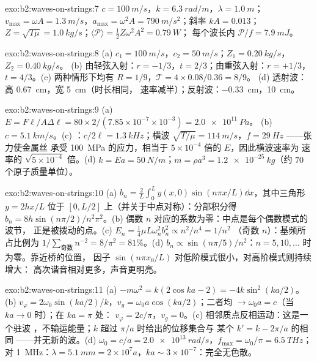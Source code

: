 \begin{solution}{exo:b2:waves-on-strings:7}
$c = \qty{100}{m/s}$，$k = \qty{6.3}{rad/m}$，$\lambda = \qty{1.0}{m}$；$v_{\max} = \omega A =
\qty{1.3}{m/s}$，$a_{\max} = \omega^2A = \qty{790}{m/s^2}$；斜率 $kA = 0.013$；$Z =
\sqrt{T\mu} = \qty{1.0}{kg/s}$；$\langle\mathcal P\rangle = \tfrac12Z\omega^2A^2 = \qty{0.79}{W}$；
每个波长内 $\mathcal P/f = \qty{7.9}{mJ}$。
\end{solution}

\begin{solution}{exo:b2:waves-on-strings:8}
(a) $c_1 = \qty{100}{m/s}$，$c_2 = \qty{50}{m/s}$；$Z_1 = \qty{0.20}{kg/s}$，$Z_2 = \qty{0.40}{kg/s}$。
(b) 由轻弦入射：$r = -1/3$，$t = 2/3$；由重弦入射：$r =
+1/3$，$t = 4/3$。(c) 两种情形下均有 $R = 1/9$，$\mathcal T = 4 \times 0.08/0.36 = 8/9$。
(d) 透射波：高 \qty{0.67}{cm}，宽 \qty{5}{cm}（时长相同，
速率减半）；反射波：\qty{-0.33}{cm}，\qty{10}{cm}。
\end{solution}

\begin{solution}{exo:b2:waves-on-strings:9}
(a) $E = F\ell/A\Delta\ell = 80 \times 2/(7.85 \times 10^{-7} \times 10^{-3}) = \qty{2.0e11}{Pa}$。
(b) $c = \qty{5.1}{km/s}$。(c) ：$c/2\ell = \qty{1.3}{kHz}$；横波
$\sqrt{T/\mu} = \qty{114}{m/s}$，$f = \qty{29}{Hz}$ ——张力使金属丝
承受 \qty{100}{MPa} 的应力，相当于 $5 \times 10^{-4}$ 倍的 $E$，因此横波速率为
速率的 $\sqrt{5 \times 10^{-4}}$ 倍。(d) $k = Ea = \qty{50}{N/m}$；$m
= \rho a^3 = \qty{1.2e-25}{kg}$（约 $70$ 个原子质量单位）。
\end{solution}

\begin{solution}{exo:b2:waves-on-strings:10}
(a) $b_n = \frac2L\int_0^Ly(x, 0)\sin(n\pi x/L)\dd x$，其中三角形 $y =
2hx/L$ 位于 $[0, L/2]$ 上（并关于中点对称）：分部积分得 $b_n = 8h\sin(n\pi/2)
/n^2\pi^2$。(b) 偶数 $n$ 对应的系数为零：中点是每个偶数模式的波节，
正是被拨动的点。(c) $E_n = \tfrac14\mu L\omega_n^2b_n^2 \propto n^2/n^4 = 1/n^2$
（奇数 $n$）：基频所占比例为 $1/\sum_{\text{奇数}}n^{-2} = 8/\pi^2 = 81\%$。(d)
$b_n \propto \sin(n\pi/5)/n^2$：$n = 5, 10, \dots$ 时为零。靠近桥的位置，
因子 $\sin(n\pi x_0/L)$ 对低阶模式很小，对高阶模式则持续增大：
高次谐音相对更多，声音更明亮。
\end{solution}

\begin{solution}{exo:b2:waves-on-strings:11}
(a) $-m\omega^2 = k(2\cos ka - 2) = -4k\sin^2(ka/2)$。(b) $v_\varphi = 2\omega_0\sin(ka/2)
/k$，$v_g = \omega_0a\cos(ka/2)$；二者均 $\to \omega_0a = c$（当 $ka \to 0$ 时）；在 $ka = \pi$ 处：
$v_\varphi = 2c/\pi$，$v_g = 0$。(c) 相邻质点反相运动：这是一个驻波
，不输运能量；$k$ 超过 $\pi/a$ 时给出的位移集合与
某个 $k' = k - 2\pi/a$ 的相同 ——并无新的波。(d) $\omega_0 = c/a =
\qty{2.0e13}{rad/s}$，$f_{\max} = \omega_0/\pi = \qty{6.5}{THz}$；对 \qty{1}{MHz}：$\lambda =
\qty{5.1}{mm} = 2 \times 10^7a$，$ka \sim 3 \times 10^{-7}$：完全无色散。
\end{solution}

